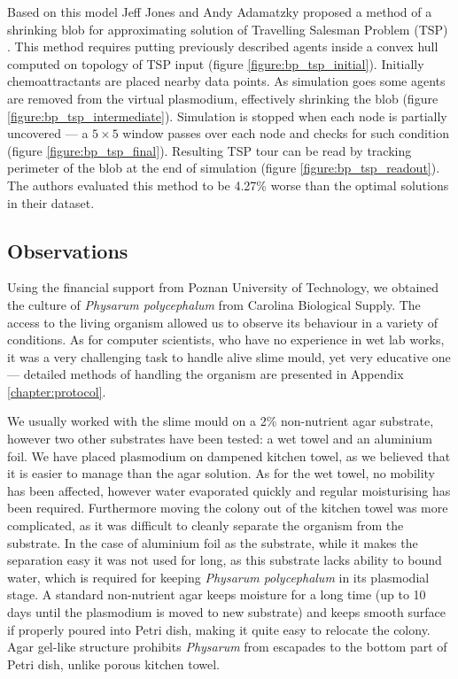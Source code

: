 \documentclass[english,a4paper,twoside]{ppfcmthesis}
\begin{document}
Based on this model Jeff Jones and Andy Adamatzky proposed a method of a shrinking blob for approximating solution of Travelling Salesman Problem (TSP) \cite{jones2014computation}. This method requires putting previously described agents inside a convex hull computed on topology of TSP input (figure \ref{figure:bp_tsp_initial}). Initially chemoattractants are placed nearby data points. As simulation goes some agents are removed from the virtual plasmodium, effectively shrinking the blob (figure \ref{figure:bp_tsp_intermediate}). Simulation is stopped when each node is partially uncovered --- a $5 \times 5$ window passes over each node and checks for such condition (figure \ref{figure:bp_tsp_final}). Resulting TSP tour can be read by tracking perimeter of the blob at the end of simulation (figure \ref{figure:bp_tsp_readout}). The authors evaluated this method to be 4.27\% worse than the optimal solutions in their dataset.


\subsection{Observations}
\label{ss:obervations}

Using the financial support from Poznan University of Technology, we obtained the culture of \textit{Physarum polycephalum} from Carolina Biological Supply. The access to the living organism allowed us to observe its behaviour in a variety of conditions. As for computer scientists, who have no experience in wet lab works, it was a very challenging task to handle alive slime mould, yet very educative one --- detailed methods of handling the organism are presented in Appendix \ref{chapter:protocol}.

We usually worked with the slime mould on a 2\% non-nutrient agar substrate, however two other substrates have been tested: a wet towel and an aluminium foil. We have placed plasmodium on dampened kitchen towel, as we believed that it is easier to manage than the agar solution. As for the wet towel, no mobility has been affected, however water evaporated quickly and regular moisturising has been required. Furthermore moving the colony out of the kitchen towel was more complicated, as it was difficult to cleanly separate the organism from the substrate. In the case of aluminium foil as the substrate, while it makes the separation easy it was not used for long, as this substrate lacks ability to bound water, which is required for keeping \textit{Physarum polycephalum} in its plasmodial stage. A standard non-nutrient agar keeps moisture for a long time (up to 10 days until the plasmodium is moved to new substrate) and keeps smooth surface if properly poured into Petri dish, making it quite easy to relocate the colony. Agar gel-like structure prohibits \textit{Physarum} from escapades to the bottom part of Petri dish, unlike porous kitchen towel. 
\end{document}
